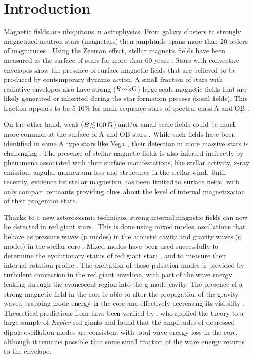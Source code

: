 \section{Introduction}
\label{intro}
Magnetic fields are ubiquitous in astrophysics. From  galaxy clusters to strongly magnetized neutron stars (magnetars) their amplitude spans more than 20 orders of magnitudes \citep{Brandenburg_2005}. Using the Zeeman effect, stellar magnetic fields have been measured at the surface of stars
for more than 60 years \citep{Babcock_1947,Landstreet_1992,Donati_2009}. Stars with convective envelopes show the presence of surface magnetic fields that are believed to be produced by contemporary dynamo action. A small fraction of stars with radiative envelopes also have strong ($B \! \sim \! {\rm kG}$) large scale magnetic fields that are likely generated or inherited during the star formation process (fossil fields). This fraction appears to be 5-10\% for main sequence stars of spectral class A \citep[e.g.,][]{Auriere2004} and OB \citep{2012ASPC..464..405W}.

On the other hand, weak ($B \! \lesssim \! 100 \, {\rm G}$) and/or small scale fields could be much more common at the surface of A and OB stars \citep{Cantiello_2011,Braithwaite_2012}. While such fields have been identified in some A type stars like Vega \citep{Lignieres2009}, their detection in more massive stars is challenging \citep{2013A&A...554A..93K}. The presence of stellar magnetic fields is also inferred indirectly by phenomena associated with their surface manifestations, like stellar activity, x-ray emission, angular momentum loss and structures in the stellar wind. Until recently, evidence for stellar magnetism has been limited to surface fields, with only compact remnants providing clues about the level of internal magnetization of their progenitor stars.

Thanks to a new asteroseismic technique, strong internal magnetic fields can now be detected in red giant stars \citep{Fuller_2015}. This is done using mixed modes, oscillations that behave as pressure waves (p modes) in the acoustic cavity and gravity waves (g modes) in the stellar core \cite{Dupret_2009}. Mixed modes have been used successfully to determine the evolutionary status of red giant stars \citep{Bedding_2011}, and to measure their internal rotation profile \citep{Beck_2011}.  The excitation of these pulsation modes is provided by turbulent convection in the red giant envelope, with part of the wave energy leaking through the evanescent region into the g-mode cavity. The presence of a strong magnetic field in the core is able to alter the propagation of the gravity waves, trapping  mode energy in the core and effectively decreasing its visibility \citep[magnetic greenhouse effect,]{Fuller_2015}. Theoretical predictions from \citet{Fuller_2015} have been verified by \citet{Stello_2016}, who applied the theory to a large sample of {\it Kepler} red giants and found that the amplitudes of depressed dipole oscillation modes are consistent with total wave energy loss in the core, although it remains possible that some small fraction of the wave energy returns to the envelope.

